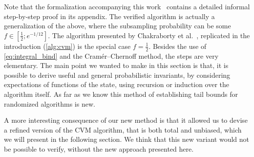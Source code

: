 Note that the formalization accompanying this work~\todo{[cite]} contains a detailed informal step-by-step proof in its appendix.
The verified algorithm is actually a generalization of the above, where the subsampling probability can be some $f \in [\frac{1}{2};e^{-1/12}]$.
The algorithm presented by Chakraborty et al.~\cite{chakraborty2022}, replicated in the introduction (\cref{alg:cvm}) is the special case $f=\frac{1}{2}$.
Besides the use of \cref{eq:integral_bind} and the Cram\'er--Chernoff method, the steps are very elementary.
The main point we wanted to make in this section is that, it is possible to derive useful and general probabilistic invariants, by considering expectations of functions of the state, using recursion or induction over the algorithm itself.
As far as we know this method of establishing tail bounds for randomized algorithms is new.

A more interesting consequence of our new method is that it allowed us to devise a refined version of the CVM algorithm, that is both total and unbiased, which we will present in the following section.
We think that this new variant would not be possible to verify, without the new approach presented here.
